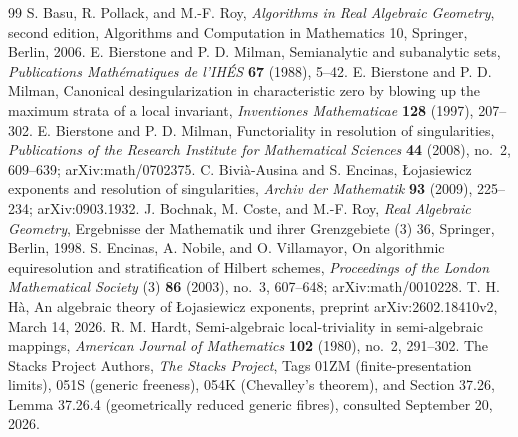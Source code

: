\begin{thebibliography}{99}
 S. Basu, R. Pollack, and M.-F. Roy,
\emph{Algorithms in Real Algebraic Geometry}, second edition,
Algorithms and Computation in Mathematics 10, Springer, Berlin, 2006.
 E. Bierstone and P. D. Milman,
Semianalytic and subanalytic sets,
\emph{Publications Math\'ematiques de l'IH\'ES} \textbf{67} (1988), 5--42.
 E. Bierstone and P. D. Milman,
Canonical desingularization in characteristic zero by blowing up the
maximum strata of a local invariant,
\emph{Inventiones Mathematicae} \textbf{128} (1997), 207--302.
 E. Bierstone and P. D. Milman,
Functoriality in resolution of singularities,
\emph{Publications of the Research Institute for Mathematical Sciences}
\textbf{44} (2008), no.~2, 609--639; arXiv:math/0702375.
 C. Bivi\`a-Ausina and S. Encinas,
\L{}ojasiewicz exponents and resolution of singularities,
\emph{Archiv der Mathematik} \textbf{93} (2009), 225--234;
arXiv:0903.1932.
 J. Bochnak, M. Coste, and M.-F. Roy,
\emph{Real Algebraic Geometry}, Ergebnisse der Mathematik und ihrer
Grenzgebiete (3) 36, Springer, Berlin, 1998.
 S. Encinas, A. Nobile, and O. Villamayor,
On algorithmic equiresolution and stratification of Hilbert schemes,
\emph{Proceedings of the London Mathematical Society} (3)
\textbf{86} (2003), no.~3, 607--648; arXiv:math/0010228.
 T. H. H\`a,
An algebraic theory of \L{}ojasiewicz exponents,
preprint arXiv:2602.18410v2, March 14, 2026.
 R. M. Hardt,
Semi-algebraic local-triviality in semi-algebraic mappings,
\emph{American Journal of Mathematics} \textbf{102} (1980), no.~2, 291--302.
 The Stacks Project Authors,
\emph{The Stacks Project}, Tags 01ZM (finite-presentation limits),
051S (generic freeness), 054K (Chevalley's theorem), and
Section 37.26, Lemma 37.26.4 (geometrically reduced generic fibres),
consulted September 20, 2026.
\end{thebibliography}
